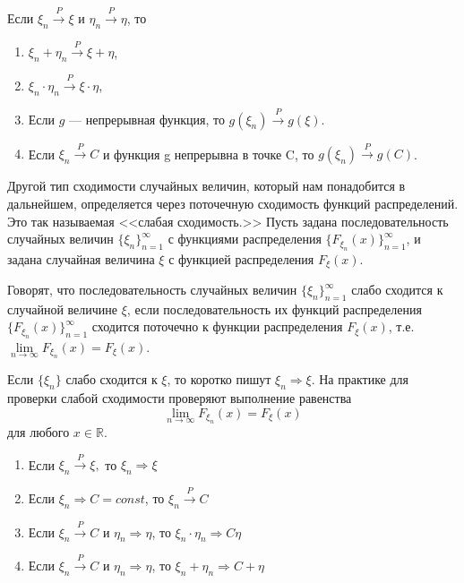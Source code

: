 \begin{theorem}
\label{th:21.8}
	Если $\xi_n \stackrel{P}{\to} \xi$ и $\eta_n\stackrel{P}{\to} \eta$, то
	\begin{enumerate}
		\item  $\xi_n + \eta_n\stackrel{P}{\to} \xi + \eta$,
		\item $\xi_n \cdot \eta_n\stackrel{P}{\to} \xi \cdot \eta$,
		\item Если $g$ — непрерывная функция, то $g(\xi_n) \stackrel{P}{\to} g(\xi)$.
		\item Если $\xi_n \stackrel{P}{\to} C$ и функция g непрерывна в точке C, то $g(\xi_n) \stackrel{P}{\to} g(C)$.
	\end{enumerate}
\end{theorem}

Другой тип сходимости случайных величин, который нам понадобится
в дальнейшем, определяется через поточечную сходимость функций распределений. Это так называемая <<слабая сходимость.>> Пусть задана последовательность случайных величин $\{\xi_n\}_{n=1}^{\infty}$ с функциями распределения $\{F_{\xi_n}(x)\}_{n=1}^{\infty}$, и задана случайная величина $\xi$ с функцией распределения $F_\xi(x)$.

\begin{definition}
\label{def:21.9}
	Говорят, что последовательность случайных величин $\{\xi_n\}_{n=1}^{\infty}$ слабо сходится к случайной величине $\xi$, если последовательность их функций распределения $\{F_{\xi_n}(x)\}^{\infty}_{n=1}$ сходится поточечно к функции распределения $F_\xi(x)$, т.е. $\lim\limits_{n\to\infty}
	F_{\xi_n}(x) = F_\xi(x)$.

Если $\{\xi_n\}$ слабо сходится к $\xi$, то коротко пишут $\xi_n \Rightarrow \xi$. На практике для проверки слабой сходимости проверяют выполнение равенства
$$\lim \limits_{n\to\infty} F_{\xi_n}(x) = F_\xi(x)$$ для любого $x \in \mathbb{R}$.
\end{definition}

\begin{theorem}
\label{th:21.10}
	\hspace{0pt}
	\begin{enumerate}
		\item Если $\xi_n\stackrel{P}{\to}\xi,$ то $\xi_n\Rightarrow\xi$
		\item Если $\xi_n\Rightarrow C=const$, то $\xi_n \stackrel{P}{\to} C$
		\item Если $\xi_n\stackrel{P}{\to} C$ и $\eta_n\Rightarrow\eta$, то $\xi_n\cdot\eta_n\Rightarrow C\eta$
		\item Если $\xi_n\stackrel{P}{\to} C$ и $\eta_n\Rightarrow\eta$, то $\xi_n+\eta_n\Rightarrow C+\eta$
	\end{enumerate}
\end{theorem}